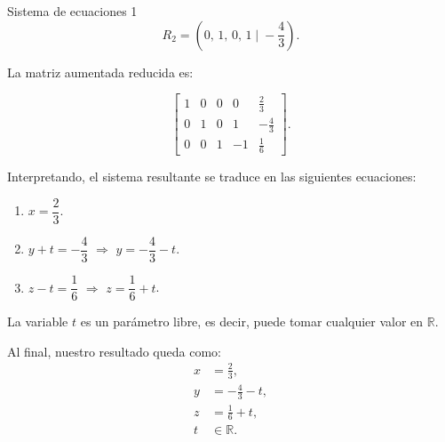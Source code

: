 \documentclass[11pt,letterpaper]{article}
\begin{document}
\begin{inciso}{Sistema de ecuaciones 1}
      \[
      R_2 = (0,\,1,\,0,\,1 \;|\; -\frac{4}{3}).
      \]
    
    La matriz aumentada reducida es:
    
    \[
    \left[\begin{array}{cccc|c}
    1 & 0 & 0 & 0 & \frac{2}{3} \\
    0 & 1 & 0 & 1 & -\frac{4}{3} \\
    0 & 0 & 1 & -1 & \frac{1}{6}
    \end{array}\right].
    \]
    
    Interpretando, el sistema resultante se traduce en las siguientes ecuaciones:
    \begin{enumerate}
        \item \(x = \dfrac{2}{3}\).
        \item \(y + t = -\dfrac{4}{3}\) $\Rightarrow$ \(y = -\dfrac{4}{3} - t\).
        \item \(z - t = \dfrac{1}{6}\) $\Rightarrow$ \(z = \dfrac{1}{6} + t\).
    \end{enumerate}

    
    La variable \(t\) es un parámetro libre, es decir, puede tomar cualquier valor en \(\mathbb{R}\).
    
Al final, nuestro resultado queda como:    
    \[
    \boxed{
    \begin{aligned}
    x &= \frac{2}{3},\\[1mm]
    y &= -\frac{4}{3} - t,\\[1mm]
    z &= \frac{1}{6} + t,\\[1mm]
    t &\in \mathbb{R}.
    \end{aligned}
    }
    \]


\end{inciso}
\end{document}
